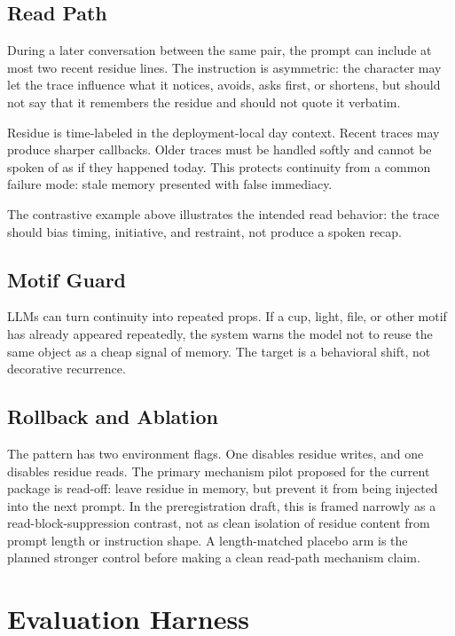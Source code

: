\documentclass[11pt]{article}
\begin{document}
\subsection{Read Path}

During a later conversation between the same pair, the prompt can include at most two recent residue lines. The instruction is asymmetric: the character may let the trace influence what it notices, avoids, asks first, or shortens, but should not say that it remembers the residue and should not quote it verbatim.

Residue is time-labeled in the deployment-local day context. Recent traces may produce sharper callbacks. Older traces must be handled softly and cannot be spoken of as if they happened today. This protects continuity from a common failure mode: stale memory presented with false immediacy.

The contrastive example above illustrates the intended read behavior: the trace
should bias timing, initiative, and restraint, not produce a spoken recap.

\subsection{Motif Guard}

LLMs can turn continuity into repeated props. If a cup, light, file, or other motif has already appeared repeatedly, the system warns the model not to reuse the same object as a cheap signal of memory. The target is a behavioral shift, not decorative recurrence.

\subsection{Rollback and Ablation}

The pattern has two environment flags. One disables residue writes, and one disables residue reads. The primary mechanism pilot proposed for the current package is read-off: leave residue in memory, but prevent it from being injected into the next prompt. In the preregistration draft, this is framed narrowly as a read-block-suppression contrast, not as clean isolation of residue content from prompt length or instruction shape. A length-matched placebo arm is the planned stronger control before making a clean read-path mechanism claim.

\section{Evaluation Harness}
\end{document}
